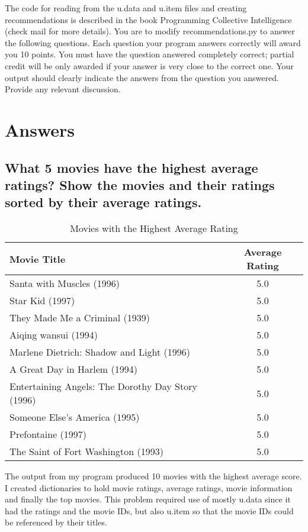 \documentclass{article}
\begin{document}
The code for reading from the u.data and u.item files and creating recommendations is described in the book Programming Collective Intelligence (check mail for more details). You are to modify recommendations.py to answer the following questions. Each question your program answers correctly will award you 10 points. You must have the question answered completely correct; partial credit will be only awarded if your answer is very close to the correct one. Your output should clearly indicate the answers from the question you answered. Provide any relevant discussion.

\newpage
\listoftables
\lstlistoflistings

\newpage
\section*{Answers}
\renewcommand\thesubsection{\arabic{subsection}}
\subsection{What 5 movies have the highest average ratings? Show the movies and their ratings sorted by their average ratings.}

\begin{table}[!h]
\centering
\begin{tabular}{l c}
Movie Title & Average Rating \\
\hline
Santa with Muscles (1996) & 5.0  \\
Star Kid (1997) & 5.0  \\
They Made Me a Criminal (1939) & 5.0  \\
Aiqing wansui (1994) & 5.0  \\
Marlene Dietrich: Shadow and Light (1996) & 5.0  \\
A Great Day in Harlem (1994) & 5.0  \\
Entertaining Angels: The Dorothy Day Story (1996) & 5.0  \\
Someone Else's America (1995) & 5.0  \\
Prefontaine (1997) & 5.0  \\
The Saint of Fort Washington (1993) & 5.0  \\
\hline
\end{tabular}
\caption{Movies with the Highest Average Rating}
\end{table}

The output from my program produced 10 movies with the highest average score. I created dictionaries to hold movie ratings, average ratings, movie information and finally the top movies. This problem required use of mostly u.data since it had the ratings and the movie IDs, but also u.item so that the movie IDs could be referenced by their titles.
\end{document}
